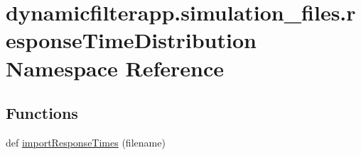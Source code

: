 \hypertarget{namespacedynamicfilterapp_1_1simulation__files_1_1response_time_distribution}{}\section{dynamicfilterapp.\+simulation\+\_\+files.\+response\+Time\+Distribution Namespace Reference}
\label{namespacedynamicfilterapp_1_1simulation__files_1_1response_time_distribution}
\subsection*{Functions}
\begin{DoxyCompactItemize}
\item 
def \hyperlink{namespacedynamicfilterapp_1_1simulation__files_1_1response_time_distribution_ae93872086b32d303395dd0b753af1775}{import\+Response\+Times} (filename)
\end{DoxyCompactItemize}
